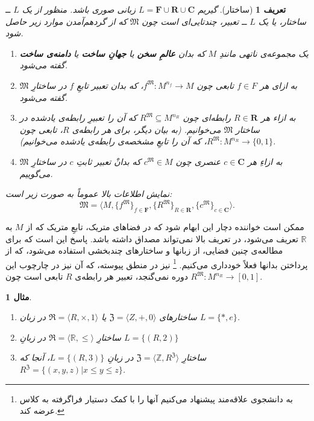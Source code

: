 \documentclass[12pt,a4paper]{article}
\theoremstyle{colorhead}
\newtheorem{mesal}[thm]{مثال}
\newtheorem{defn}[thm]{تعریف}
\begin{document}
\begin{defn}[ساختار]
گیریم
$L=\mathbf{F}\cup \mathbf{R}\cup \mathbf{C}$
زبانی صوری باشد. منظور از یک
$L$
ــ ساختار، یا یک
$L$
ــ تعبیر،
چندتایی‌ای است چون
$\mathfrak{M}$
که از گردهم‌آمدن موارد زیر حاصل شود.
\begin{enumerate}
\item 
یک مجموعه‌ی ناتهی مانندِ
$M$
که بدان 
\textbf{عالمِ سخن}
یا
\textbf{جهانِ ساخت}
یا
\textbf{دامنه‌ی ساخت}
گفته می‌شود.
\item
به ازای هر
$f\in F$
تابعی چون
$f^\mathfrak{M}:M^{n_f}\to M$،
که بدان تعبیر تابعِ 
$f$
در ساختارِ
$\mathfrak{M}$
گفته می‌شود.
\item 
به ازاء هر
$R\in \mathbf{R}$
رابطه‌ای چون
$R^\mathfrak{M}\subseteq M^{n_R}$
که آن را تعبیرِ رابطه‌ی یادشده در ساختار
$\mathfrak{M}$
می‌خوانیم. (به بیان دیگر،
برای هر رابطه‌ی
$R$،
 تابعی چون
$R^\mathfrak{M}:M^{n_R}\to \{0,1\}$، 
که آن را تابع‌ِ مشخصه‌ی رابطه‌ی یادشده می‌خوانیم).
\item
به ازاءِ هر 
$c\in \mathbf{C}$
عنصری چون
$c^{\mathfrak{M}}\in M$
که بدانْ تعبیر ثابتِ 
$c$
در ساختارِ
$\mathfrak{M}$
می‌گوییم.
\end{enumerate}
نمایش اطلاعات بالا عموماً به صورت زیر است:
\[
\mathfrak{M}=\langle M, \{f^\mathfrak{M}\}_{f\in \mathbf{F}}, \{R^\mathfrak{M}\}_{R\in \mathbf{R}}, \{c^\mathfrak{M}\}_{c\in \mathbf{C}}\rangle.
\]
\end{defn}
ممکن است خواننده دچار این ابهام شود که در فضاهای متریک، تابعِ متریک که از
$M$
به
$\mathbb{R}$
تعریف می‌شود، در تعریف بالا نمی‌تواند مصداق داشته باشد. پاسخ این است که برای مطالعه‌ی چنین فضایی، از زبانها و  ساختارهای چندبخشی 
استفاده می‌شود، که از پرداختن بدانها فعلاً خودداری می‌کنیم.
\footnote{ 
به
دانشجوی علاقه‌مند پیشنهاد می‌کنیم آنها را با کمک دستیار فراگرفته به کلاس عرضه کند.}
نیز در منطق پیوسته،
که آن نیز در چارچوب این دوره‌ نمی‌گنجد،
 تعبیر هر رابطه‌ی
$R$
تابعی است چون
$R^\mathfrak{M}:M^{n_R}\to [0,1]$.
\begin{mesal}
\hfill 
\begin{enumerate}
\item 
ساختارهای
$\mathfrak{Z}=\langle Z,+,0\rangle$
یا
$\mathfrak{R}=\langle R,\times, 1\rangle$
در زبان
$L=\{*,e\}$.
\item 
ساختارِ
$\mathfrak{R}=\langle \mathbb{R},\leq\rangle$
در زبانِ
$L=\{(R,2)\}$
\item 
ساختارِ
$\mathfrak{Z}=\langle \mathbb{Z},R^\mathfrak{Z}\rangle$
در زبانِ
$L=\{(R,3)\}$، 
آنجا که
\mbox{$R^\mathfrak{Z}=\{(x,y,z)|x\leq y\leq z\}$}.
\end{enumerate}
\end{mesal}
\end{document}
